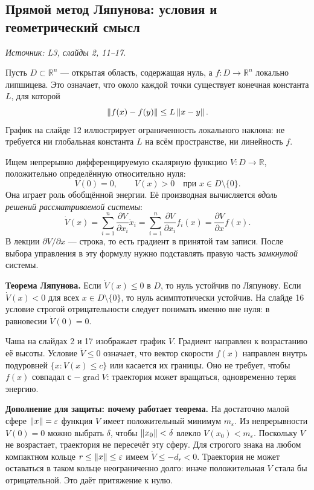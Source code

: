 \subsection{Прямой метод Ляпунова: условия и геометрический смысл}
\label{subsec:stability-direct}
\noindent\textit{Источник: L3, слайды 2, 11--17.}

Пусть $D\subset\mathbb R^n$ --- открытая область, содержащая нуль,
а $f:D\to\mathbb R^n$ локально липшицева.
Это означает, что около каждой точки существует конечная
константа $L$, для которой
\[
 \left\lVert f(x)-f(y)\right\rVert\le L\left\lVert x-y\right\rVert.
\]
График на слайде 12 иллюстрирует ограниченность локального наклона:
не требуется ни глобальная константа $L$ на всём пространстве,
ни линейность $f$.

Ищем непрерывно дифференцируемую скалярную функцию
$V:D\to\mathbb R$, положительно определённую относительно нуля:
\[
 V(0)=0,\qquad V(x)>0\quad\text{при }x\in D\setminus\{0\}.
\]
Она играет роль обобщённой энергии. Её производная вычисляется
\emph{вдоль решений рассматриваемой системы}:
\[
 \dot V(x)=\sum_{i=1}^{n}\frac{\partial V}{\partial x_i}\dot x_i
 =\sum_{i=1}^{n}\frac{\partial V}{\partial x_i}f_i(x)
 =\frac{\partial V}{\partial x}f(x).
\]
В лекции $\partial V/\partial x$ --- строка, то есть градиент
в принятой там записи. После выбора управления в эту формулу
нужно подставлять правую часть \emph{замкнутой} системы.

\textbf{Теорема Ляпунова.}
Если $\dot V(x)\le0$ в $D$, то нуль устойчив по Ляпунову.
Если $\dot V(x)<0$ для всех $x\in D\setminus\{0\}$,
то нуль асимптотически устойчив.
На слайде 16 условие строгой отрицательности следует понимать
именно вне нуля: в равновесии $\dot V(0)=0$.

Чаша на слайдах 2 и 17 изображает график $V$.
Градиент направлен к возрастанию её высоты.
Условие $\dot V\le0$ означает, что вектор скорости $f(x)$
направлен внутрь подуровней $\{x:V(x)\le c\}$ или касается их
границы. Оно не требует, чтобы $f(x)$ совпадал с
$-\operatorname{grad}V$: траектория может вращаться, одновременно
теряя энергию.

\textbf{Дополнение для защиты: почему работает теорема.}
На достаточно малой сфере $\left\lVert x\right\rVert=\varepsilon$ функция $V$
имеет положительный минимум $m_\varepsilon$.
Из непрерывности $V(0)=0$ можно выбрать $\delta$, чтобы
$\left\lVert x_0\right\rVert<\delta$ влекло $V(x_0)<m_\varepsilon$.
Поскольку $V$ не возрастает, траектория не пересечёт эту сферу.
Для строгого знака на любом компактном кольце
$r\le\left\lVert x\right\rVert\le\varepsilon$ имеем $\dot V\le-d_r<0$.
Траектория не может оставаться в таком кольце неограниченно долго:
иначе положительная $V$ стала бы отрицательной.
Это даёт притяжение к нулю.

